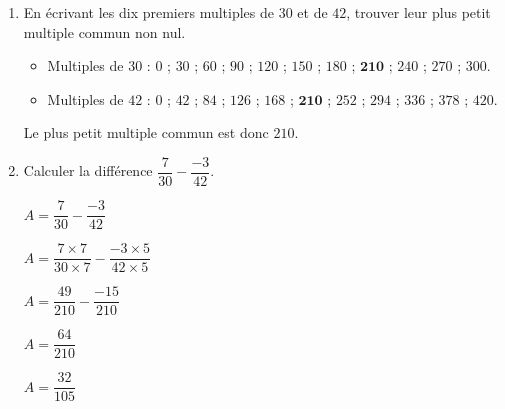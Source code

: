     \begin{enumerate}
        \item En écrivant les dix premiers multiples de $30$ et de $42$, trouver leur plus petit multiple commun non nul.
        \begin{itemize}
            \item Multiples de $30$ : $0$ ; $30$ ; $60$ ; $90$ ; $120$ ; $150$ ; $180$ ; $\mathbf{210}$ ; $240$ ; $270$ ; $300$.
            \item Multiples de $42$ : $0$ ; $42$ ; $84$ ; $126$ ; $168$ ; $\mathbf{210}$ ; $252$ ; $294$ ; $336$ ; $378$ ; $420$.
        \end{itemize}
        Le plus petit multiple commun est donc $210$.
        \smallskip
        \item Calculer la différence $\dfrac{7}{30}-\dfrac{-3}{42}$.
        \begin{spacing}{2}
            \begin{multicols}{2}
                $A = \dfrac{7}{30}-\dfrac{-3}{42}$

                $A = \dfrac{7\times 7}{30\times 7}-\dfrac{-3\times 5}{42\times 5}$

                $A = \dfrac{49}{210}-\dfrac{-15}{210}$

                $A = \dfrac{64}{210}$

                $A = \dfrac{32}{105}$
            \end{multicols}
        \end{spacing}
    \end{enumerate}
